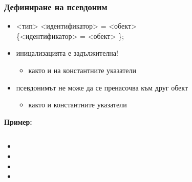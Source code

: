 \documentclass{beamer}
\begin{document}
\newcommand{\labeledcell}[2]{
  \node [cell,label=above:{\tt{#1}}] {\tt{#2}};
}

\begin{frame}
  \frametitle{Дефиниране на псевдоним}

  \begin{itemize}[<+->]
  \item{} <тип>\tta{\&} <идентификатор> \tta= <обект>\\
    \hspace{5ex} \{\tta{, \&}<идентификатор> \tta= <обект> \}\tta;
  \item иницализацията е \alert{задължителна}!
    \begin{itemize}
    \item както и на константните указатели
    \end{itemize}
  \item псевдонимът \alert{не може} да се пренасочва към друг обект
    \begin{itemize}
    \item както и константните указатели
    \end{itemize}
  \end{itemize}
  \onslide<+->
  \textbf{Пример:}
  \begin{columns}[T,onlytextwidth]
    \begin{column}{.5\textwidth}
      \begin{itemize}[<+->]
      \item {}
      \item {}
      \item {}
      \item {}
      \end{itemize}
    \end{column}
    \begin{column}{.5\textwidth}
      \only<7>{\tikz{\labeledcell{x\phantom{,a}}3}}
      \only<8-10>{\tikz{\labeledcell{x,a}3}}
      \only<11>{\tikz{\labeledcell{x,a}8}}
      \hspace{5ex}
      \only<8>{\tikz{\labeledcell{b\phantom{,b}}3}}
      \only<9->{\tikz{\labeledcell{b,c}3}}
    \end{column}
  \end{columns}
\end{frame}
\end{document}
